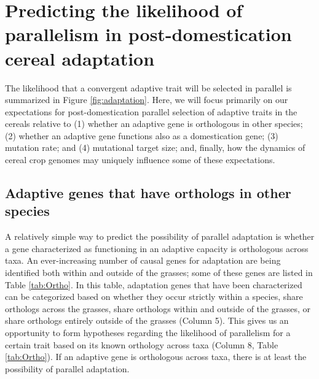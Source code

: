 \documentclass[12pt]{article}
\begin{document}
\section*{Predicting the likelihood of parallelism in post-domestication cereal adaptation}
The likelihood that a convergent adaptive trait will be selected in parallel is summarized in Figure \ref{fig:adaptation}.
Here, we will focus primarily on our expectations for post-domestication parallel selection of adaptive traits in the cereals relative to (1) whether an adaptive gene is orthologous in other species; (2) whether an adaptive gene functions also as a domestication gene; (3) mutation rate; and (4) mutational target size; and, finally, how the dynamics of cereal crop genomes may uniquely influence some of these expectations. 

\subsection*{Adaptive genes that have orthologs in other species}
A relatively simple way to predict the possibility of parallel adaptation is whether a gene characterized as functioning in an adaptive capacity is orthologous across taxa. 
An ever-increasing number of causal genes for adaptation are being identified both within and outside of the grasses; some of these genes are listed in Table \ref{tab:Ortho}.
In this table, adaptation genes that have been characterized can be categorized based on whether they occur strictly within a species, share orthologs across the grasses, share orthologs within and outside of the grasses, or share orthologs entirely outside of the grasses (Column 5).
This gives us an opportunity to form hypotheses regarding the likelihood of parallelism for a certain trait based on its known orthology across taxa (Column 8, Table \ref{tab:Ortho}).
If an adaptive gene is orthologous across taxa, there is at least the possibility of parallel adaptation. 
\end{document}
